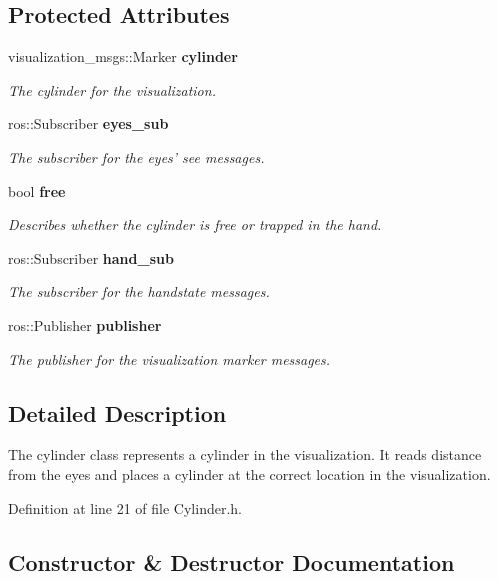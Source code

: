 \subsection*{Protected Attributes}
\begin{DoxyCompactItemize}
\item 
visualization\-\_\-msgs\-::\-Marker {\bf cylinder}
\begin{DoxyCompactList}\small\item\em The cylinder for the visualization. \end{DoxyCompactList}\item 
ros\-::\-Subscriber {\bf eyes\-\_\-sub}
\begin{DoxyCompactList}\small\item\em The subscriber for the eyes' see messages. \end{DoxyCompactList}\item 
bool {\bf free}
\begin{DoxyCompactList}\small\item\em Describes whether the cylinder is free or trapped in the hand. \end{DoxyCompactList}\item 
ros\-::\-Subscriber {\bf hand\-\_\-sub}
\begin{DoxyCompactList}\small\item\em The subscriber for the handstate messages. \end{DoxyCompactList}\item 
ros\-::\-Publisher {\bf publisher}
\begin{DoxyCompactList}\small\item\em The publisher for the visualization marker messages. \end{DoxyCompactList}\end{DoxyCompactItemize}


\subsection{Detailed Description}
The cylinder class represents a cylinder in the visualization. It reads distance from the eyes and places a cylinder at the correct location in the visualization. 

Definition at line 21 of file Cylinder.\-h.



\subsection{Constructor \& Destructor Documentation}
